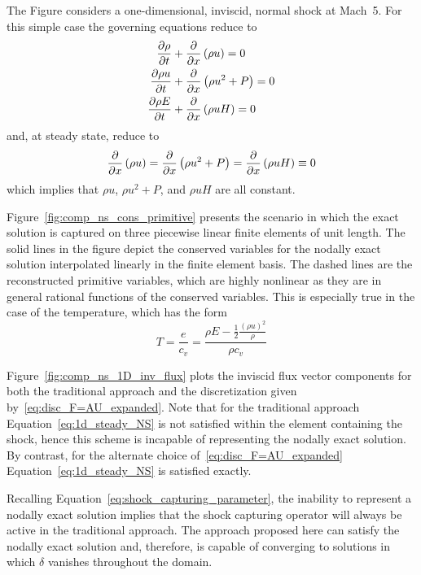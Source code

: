 The Figure considers a one-dimensional, inviscid, normal shock at Mach~5.  For this simple case the governing equations reduce to
\begin{align*}
  {\frac{\partial{\rho}}{\partial{t}}} &+ {\frac{\partial{}}{\partial{x}}} \left(\rho u\right) = 0 \\
  {\frac{\partial{\rho u}}{\partial{t}}} &+ {\frac{\partial{}}{\partial{x}}}\left(\rho u^2 + P\right) = 0 \\
  {\frac{\partial{\rho E}}{\partial{t}}} &+ {\frac{\partial{}}{\partial{x}}} \left(\rho u H\right) = 0
\end{align*}
and, at steady state, reduce to
\begin{equation}
  {\frac{\partial{}}{\partial{x}}} \left(\rho u\right) = {\frac{\partial{}}{\partial{x}}} \left(\rho u^2 + P\right) = {\frac{\partial{}}{\partial{x}}} \left(\rho u H\right) \equiv 0 \label{eq:1d_steady_NS}
\end{equation}
which implies that $\rho u$, $\rho u^2+P$, and $\rho u H$ are all constant.

Figure~\ref{fig:comp_ns_cons_primitive} presents the scenario in which the exact solution is captured on three piecewise linear finite elements of unit length.  The solid lines in the figure depict the conserved variables for the nodally exact solution interpolated linearly in the finite element basis.  The dashed lines are the reconstructed primitive variables, which are highly nonlinear as they are in general rational functions of the conserved variables.  This is especially true in the case of the temperature, which has the form
\begin{equation*}
  T = \frac{e}{c_v} = \frac{\rho E - \frac{1}{2}\frac{\left(\rho u\right)^2}{\rho}}{\rho c_v} 
\end{equation*}

Figure~\ref{fig:comp_ns_1D_inv_flux} plots the inviscid flux vector components for both the traditional approach and the discretization given by~\eqref{eq:disc_F=AU_expanded}.  Note that for the traditional approach Equation~\eqref{eq:1d_steady_NS} is not satisfied within the element containing the shock, hence this scheme is incapable of representing the nodally exact solution.  By contrast, for the alternate choice of~\eqref{eq:disc_F=AU_expanded} Equation~\eqref{eq:1d_steady_NS} is satisfied exactly.

Recalling Equation~\eqref{eq:shock_capturing_parameter}, the inability to represent a nodally exact solution implies that the shock capturing operator will always be active in the traditional approach. The approach proposed here can satisfy the nodally exact solution and, therefore, is capable of converging to solutions in which $\delta$ vanishes throughout the domain.

